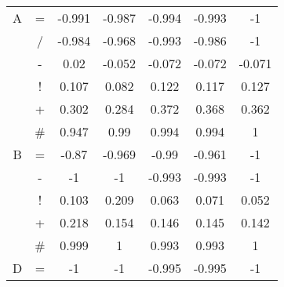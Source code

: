 \documentclass{sfuthesis}
\begin{document}
\begin{table}
\begin{tabular}{ccccccc}
			A              & \multicolumn{1}{c|}{=}                & -0.991             & -0.987                & -0.994               & \multicolumn{1}{c|}{-0.993}              & -1            \\
			& \multicolumn{1}{c|}{/}                & -0.984             & -0.968                & -0.993               & \multicolumn{1}{c|}{-0.986}              & -1            \\
			& \multicolumn{1}{c|}{-}                & 0.02               & -0.052                & -0.072               & \multicolumn{1}{c|}{-0.072}              & -0.071        \\
			& \multicolumn{1}{c|}{!}                & 0.107              & 0.082                 & 0.122                & \multicolumn{1}{c|}{0.117}               & 0.127         \\
			& \multicolumn{1}{c|}{+}                & 0.302              & 0.284                 & 0.372                & \multicolumn{1}{c|}{0.368}               & 0.362         \\
			& \multicolumn{1}{c|}{\#}               & 0.947              & 0.99                  & 0.994                & \multicolumn{1}{c|}{0.994}               & 1             \\ \hline
			B              & \multicolumn{1}{c|}{=}                & -0.87              & -0.969                & -0.99                & \multicolumn{1}{c|}{-0.961}              & -1            \\
			& \multicolumn{1}{c|}{-}                & -1                 & -1                    & -0.993               & \multicolumn{1}{c|}{-0.993}              & -1            \\
			& \multicolumn{1}{c|}{!}                & 0.103              & 0.209                 & 0.063                & \multicolumn{1}{c|}{0.071}               & 0.052         \\
			& \multicolumn{1}{c|}{+}                & 0.218              & 0.154                 & 0.146                & \multicolumn{1}{c|}{0.145}               & 0.142         \\
			& \multicolumn{1}{c|}{\#}               & 0.999              & 1                     & 0.993                & \multicolumn{1}{c|}{0.993}               & 1             \\ \hline
			D              & \multicolumn{1}{c|}{=}                & -1                 & -1                    & -0.995               & \multicolumn{1}{c|}{-0.995}              & -1            \\

\end{tabular}
\end{table}
\end{document}
